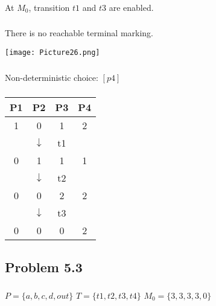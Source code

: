 \documentclass[a4paper]{article}
\begin{document}
\subsubsection{}
At $M_{0}$, transition $t1$ and $t3$ are enabled.
\subsubsection{}
There is no reachable terminal marking.
\begin{center}
    \texttt{[image: Picture26.png]}
\end{center}
\subsubsection{}
Non-deterministic choice: $[p4]$
\subsubsection{}
\begin{center}
    \begin{tabular}{c c c c}
        P1 & P2 & P3 & P4\\
        \hline
        1 & 0 & 1 & 2\\
        \hline
        & $\downarrow$ & t1 &\\
        \hline
        0 & 1 & 1 & 1\\
        \hline
        & $\downarrow$ & t2 &\\
        \hline
        0 & 0 & 2 & 2\\
        \hline
        & $\downarrow$ & t3 &\\
        \hline
        0 & 0 & 0 & 2\\
    \end{tabular}
\end{center}
\subsection{Problem 5.3}
\subsubsection{}
$P = \{a,b,c,d,out\}$
$T = \{t1,t2,t3,t4\}$
$M_{0} = \{3,3,3,3,0\}$
\end{document}
